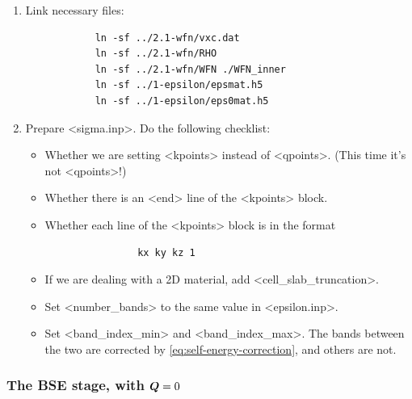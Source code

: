 \documentclass[hyperref, a4paper, 12pt]{report}
\def\texttt#1{<#1>}%
\newcommand{\shortcode}[1]{\texttt{#1}}
\begin{document}
\begin{enumerate}
\begin{enumerate}
        \item Link necessary files:
        \begin{lstlisting}
            ln -sf ../2.1-wfn/vxc.dat 
            ln -sf ../2.1-wfn/RHO 
            ln -sf ../2.1-wfn/WFN ./WFN_inner
            ln -sf ../1-epsilon/epsmat.h5 
            ln -sf ../1-epsilon/eps0mat.h5 
        \end{lstlisting}
        \item Prepare \shortcode{sigma.inp}. Do the following checklist:
        \begin{itemize}
            \item Whether we are setting \shortcode{kpoints} instead of \shortcode{qpoints}.
            (This time it's not \shortcode{qpoints}!)
            \item Whether there is an \shortcode{end} line of the \shortcode{kpoints} block.
            \item Whether each line of the \shortcode{kpoints} block is in the format
            \begin{lstlisting}
                kx ky kz 1
            \end{lstlisting}
            \item If we are dealing with a 2D material, add \shortcode{cell_slab_truncation}.
            \item Set \shortcode{number_bands} to the same value in \shortcode{epsilon.inp}.
            \item Set \shortcode{band_index_min} and \shortcode{band_index_max}.
            The bands between the two are corrected by \eqref{eq:self-energy-correction},
            and others are not.
        \end{itemize}
    \end{enumerate}
\end{enumerate}

\subsubsection{The BSE stage, with $\vb*{Q} = 0$}
\end{document}
